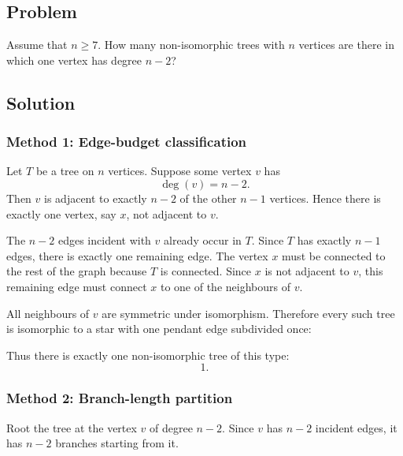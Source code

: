 \documentclass[12pt]{article}
\begin{document}
\subsection{Problem}
Assume that $n\ge 7$. How many non-isomorphic trees with $n$ vertices are there in which one vertex has degree $n-2$?

\subsection{Solution}

\subsubsection{Method 1: Edge-budget classification}
Let $T$ be a tree on $n$ vertices. Suppose some vertex $v$ has
\[
  \deg(v)=n-2.
\]
Then $v$ is adjacent to exactly $n-2$ of the other $n-1$ vertices. Hence there is exactly one vertex, say $x$, not adjacent to $v$.

The $n-2$ edges incident with $v$ already occur in $T$. Since $T$ has exactly $n-1$ edges, there is exactly one remaining edge. The vertex $x$ must be connected to the rest of the graph because $T$ is connected. Since $x$ is not adjacent to $v$, this remaining edge must connect $x$ to one of the neighbours of $v$.

All neighbours of $v$ are symmetric under isomorphism. Therefore every such tree is isomorphic to a star with one pendant edge subdivided once:
\begin{center}
\end{center}
Thus there is exactly one non-isomorphic tree of this type:
\[
  \boxed{1}.
\]

\subsubsection{Method 2: Branch-length partition}
Root the tree at the vertex $v$ of degree $n-2$. Since $v$ has $n-2$ incident edges, it has $n-2$ branches starting from it.
\end{document}
